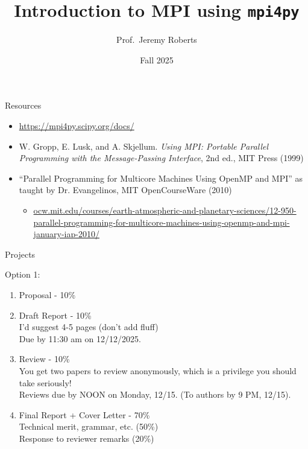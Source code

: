\documentclass[10pt,handout]{beamer}
\title %
[MPI in Python]{Introduction to MPI using {\tt mpi4py}}
\author[Roberts]{Prof.~Jeremy Roberts}
\date
{Fall 2025}
\begin{document}
\begin{frame}[plain]
  \titlepage
\end{frame}


\begin{frame}{Resources}
 
\begin{itemize}
 \item \url{https://mpi4py.scipy.org/docs/}
 \item W. Gropp, E. Lusk, and A. Skjellum. 
       {\it Using MPI: Portable Parallel Programming with the Message-Passing 
       Interface}, 2nd ed., MIT Press (1999)
 \item ``Parallel Programming for Multicore Machines Using OpenMP and MPI''
       as taught by Dr. Evangelinos, MIT OpenCourseWare (2010)
       \begin{itemize}
         \item \url{ocw.mit.edu/courses/earth-atmospheric-and-planetary-sciences/12-950-parallel-programming-for-multicore-machines-using-openmp-and-mpi-january-iap-2010/}
       \end{itemize}
\end{itemize}
 
\end{frame}

\begin{frame}{Projects}

Option 1:
\begin{enumerate}
 \item Proposal - 10\%
 \item Draft Report - 10\% \\
  I'd suggest 4-5 pages (don't add fluff) \\
  Due by 11:30 am on 12/12/2025. \\
 \item Review - 10\% \\
    You get two papers to review anonymously, which is a privilege you should take seriously! \\
    Reviews due by NOON on Monday, 12/15.  (To authors by 9 PM, 12/15).
 \item Final Report + Cover Letter - 70\% \\
       Technical merit, grammar, etc. (50\%) \\
       Response to reviewer remarks (20\%)
\end{enumerate}

\end{frame}
\end{document}
